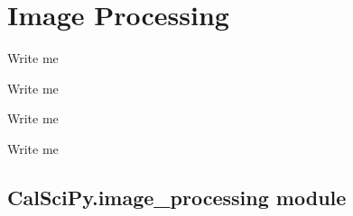 \documentclass[letterpaper,10pt,english]{sphinxmanual}
\begin{document}
\section{Image Processing}
\label{\detokenize{Sub-Packages:image-processing}}\label{\detokenize{Sub-Packages:image-processing-module}}
\begin{DUlineblock}{0em}
\item[] Write me
\item[] Write me
\item[] Write me
\item[] Write me
\end{DUlineblock}

\sphinxstepscope


\subsection{CalSciPy.image\_processing module}
\label{\detokenize{CalSciPy.image_processing:module-CalSciPy.image_processing}}\label{\detokenize{CalSciPy.image_processing:calscipy-image-processing-module}}\label{\detokenize{CalSciPy.image_processing::doc}}
\end{document}
